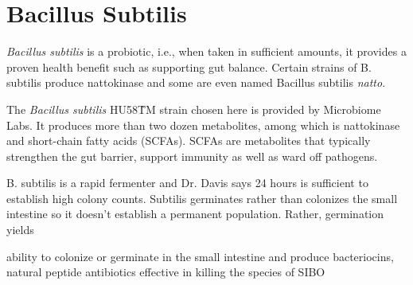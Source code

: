 \section{Bacillus Subtilis}
\textit{Bacillus subtilis} is a probiotic, i.e., when taken in sufficient amounts, it provides a proven health benefit such as supporting gut balance. Certain strains of B. subtilis produce nattokinase and some are even named Bacillus subtilis \textit{natto}.

The \textit{Bacillus subtilis} HU58\^TM strain chosen here is provided by Microbiome Labs. It produces more than two dozen metabolites, among which is nattokinase and short-chain fatty acids (SCFAs). SCFAs are metabolites that typically strengthen the gut barrier, support immunity as well as ward off pathogens.

B. subtilis is a rapid fermenter and Dr. Davis says 24 hours is sufficient to establish high colony counts. Subtilis germinates rather than colonizes the small intestine so it doesn't establish a permanent population. Rather, germination yields 

 ability to colonize or germinate in the small intestine and produce bacteriocins, natural peptide antibiotics effective in killing the species of SIBO